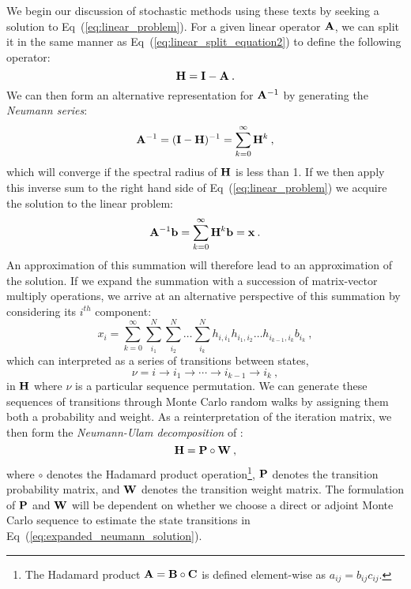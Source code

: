 We begin our discussion of stochastic methods using these texts by
seeking a solution to Eq~(\ref{eq:linear_problem}). For a given linear
operator $\mathbf{A}$, we can split it in the same manner as
Eq~(\ref{eq:linear_split_equation2}) to define the following operator:
\begin{equation}
  \mathbf{H} = \mathbf{I} - \mathbf{A}\:.
  \label{eq:linear_mc_iteration_matrix}
\end{equation}
We can then form an alternative representation for $\mathbf{A}^{-1}$ by
generating the \textit{Neumann series}:
\begin{equation}
  \mathbf{A}^{-1} = (\mathbf{I}-\mathbf{H})^{-1} = \sum_{k=0}^{\infty} \mathbf{H}^k\:,
  \label{eq:neumann_series}
\end{equation}
which will converge if the spectral radius of $\mathbf{H}$ is less than
1. If we then apply this inverse sum to the right hand side of
Eq~(\ref{eq:linear_problem}) we acquire the solution to the linear
problem:
\begin{equation}
  \mathbf{A}^{-1}\mathbf{b} = \sum_{k=0}^{\infty} \mathbf{H}^k\mathbf{b} = \mathbf{x}\:.
  \label{eq:neumann_solution}
\end{equation}
An approximation of this summation will therefore lead to an
approximation of the solution. If we expand the summation with a
succession of matrix-vector multiply operations, we arrive at an
alternative perspective of this summation by considering its $i^{th}$
component:
\begin{equation}
  x_i = \sum_{k=0}^{\infty}\sum_{i_1}^{N}\sum_{i_2}^{N}\ldots
  \sum_{i_k}^{N}h_{i,i_1}h_{i_1,i_2}\ldots h_{i_{k-1},i_k}b_{i_k}\:,
  \label{eq:expanded_neumann_solution}
\end{equation}
which can interpreted as a series of transitions between states,
\begin{equation}
 \nu = i \rightarrow i_1 \rightarrow \cdots \rightarrow i_{k-1}
 \rightarrow i_{k}\:,
  \label{eq:mc_walk_permutation}
\end{equation}
in $\mathbf{H}$ where $\nu$ is a particular sequence permutation. We can
generate these sequences of transitions through Monte Carlo random
walks by assigning them both a probability and weight. As a
reinterpretation of the iteration matrix, we then form the
\textit{Neumann-Ulam decomposition} of :
\begin{equation}
  \mathbf{H} = \mathbf{P} \circ \mathbf{W}\:,
  \label{eq:neumann_ulam_decomposition}
\end{equation}
where $\circ$ denotes the Hadamard product operation\footnote{The Hadamard
  product $\mathbf{A} = \mathbf{B} \circ \mathbf{C}$ is defined element-wise as
  $a_{ij} = b_{ij} c_{ij}$.}, $\mathbf{P}$ denotes the transition
probability matrix, and $\mathbf{W}$ denotes the transition weight
matrix. The formulation of $\mathbf{P}$ and $\mathbf{W}$ will be dependent on
whether we choose a direct or adjoint Monte Carlo sequence to estimate
the state transitions in Eq~(\ref{eq:expanded_neumann_solution}).

